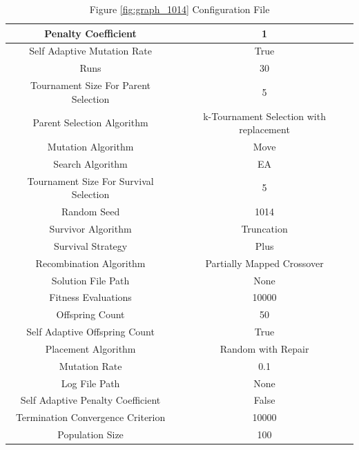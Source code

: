 \documentclass{standalone}
\begin{document}
\begin{table}[!htb]
	\centering
	\caption{Figure \ref{fig:graph_1014} Configuration File}
	\label{tab:graph_1014}
	\begin{tabular}{| c | c |}
		\hline
		Penalty Coefficient		& 1		 \\
		\hline
		Self Adaptive Mutation Rate		& True		 \\
		\hline
		Runs		& 30		 \\
		\hline
		Tournament Size For Parent Selection		& 5		 \\
		\hline
		Parent Selection Algorithm		& k-Tournament Selection with replacement		 \\
		\hline
		Mutation Algorithm		& Move		 \\
		\hline
		Search Algorithm		& EA		 \\
		\hline
		Tournament Size For Survival Selection		& 5		 \\
		\hline
		Random Seed		& 1014		 \\
		\hline
		Survivor Algorithm		& Truncation		 \\
		\hline
		Survival Strategy		& Plus		 \\
		\hline
		Recombination Algorithm		& Partially Mapped Crossover		 \\
		\hline
		Solution File Path		& None		 \\
		\hline
		Fitness Evaluations		& 10000		 \\
		\hline
		Offspring Count		& 50		 \\
		\hline
		Self Adaptive Offspring Count		& True		 \\
		\hline
		Placement Algorithm		& Random with Repair		 \\
		\hline
		Mutation Rate		& 0.1		 \\
		\hline
		Log File Path		& None		 \\
		\hline
		Self Adaptive Penalty Coefficient		& False		 \\
		\hline
		Termination Convergence Criterion		& 10000		 \\
		\hline
		Population Size		& 100		 \\
		\hline
	\end{tabular}
\end{table}
\end{document}
